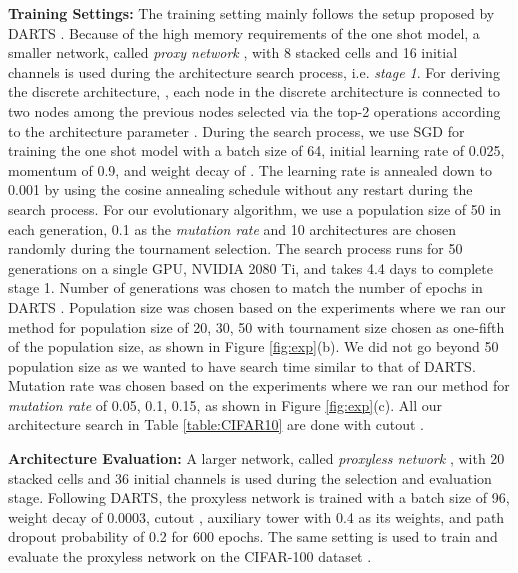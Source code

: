 \documentclass[final]{cvpr}
\begin{document}
\textbf{Training Settings:} The training setting mainly follows the setup proposed by DARTS
\cite{liu2018darts2}. Because of the high memory requirements of the one shot model, a smaller
network, called \textit{proxy network} \cite{li2019random}, with 8 stacked cells and 
16 initial channels is used during the architecture search process, i.e. \textit{stage 1}.
For deriving the discrete architecture, , each node in the discrete architecture
is connected to two nodes among the previous nodes selected via the top-2 operations
according to the architecture parameter . During the search process, we use SGD for
training the one shot model with a batch size of 64, initial learning rate of 0.025, momentum of
0.9, and weight decay of .  The learning rate is annealed down to 0.001 by using
the cosine annealing schedule without any restart during the search process. For our evolutionary
algorithm, we use a population size of 50 in each generation, 0.1 as the \textit{mutation rate}
and 10 architectures are chosen randomly during the tournament selection. The search process runs
for 50 generations on a single GPU, NVIDIA 2080 Ti, and takes 4.4 days to complete stage 1. Number
of generations was chosen to match the number of epochs in DARTS \cite{liu2018darts2}. Population
size was chosen based on the experiments where we ran our method for population size of 20, 30, 50
with tournament size chosen as one-fifth of the population size, as shown in Figure
\ref{fig:exp}(b). We did not go beyond 50 population size as we wanted to have search time
similar to that of DARTS. Mutation rate was chosen based on the experiments where we ran our
method for \textit{mutation rate} of 0.05, 0.1, 0.15, as shown in Figure \ref{fig:exp}(c). All our
architecture search in Table \ref{table:CIFAR10} are done with cutout \cite{devries2017improved}.

\textbf{Architecture Evaluation:} A larger network, called \textit{proxyless network} 
\cite{li2019random}, with 20 stacked cells and 36 initial channels is used during the selection
and evaluation stage. Following DARTS\cite{liu2018darts2}, the proxyless network is trained with a
batch size of 96, weight decay of 0.0003, cutout \cite{devries2017improved}, auxiliary tower with
0.4 as its weights, and path dropout probability of 0.2 for 600 epochs. The same setting is used
to train and evaluate the proxyless network on the CIFAR-100 dataset
\cite{krizhevsky2009learning}.
\end{document}
